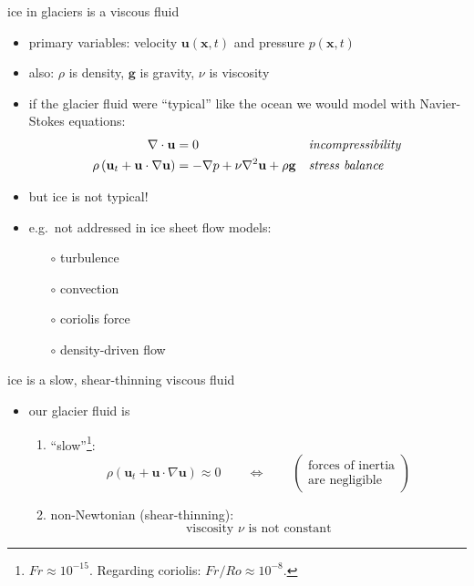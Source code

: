 \documentclass{beamer}
\newcommand{\bx}{\mathbf{x}}
\begin{document}
\begin{frame}{ice in glaciers is a viscous fluid}

\begin{itemize}
\item primary variables: velocity $\mathbf{u}(\bx,t)$ and pressure $p(\bx,t)$
\item also: $\rho$ is density, $\mathbf{g}$ is gravity, $\nu$ is viscosity
\item if the glacier fluid were ``typical'' like the ocean we would model with Navier-Stokes equations:
\begin{align*}
\nabla \cdot \mathbf{u} &= 0 &&\text{\emph{incompressibility}} \\
\rho \left(\mathbf{u}_t + \mathbf{u}\cdot\nabla \mathbf{u}\right) &= -\nabla p + \nu \nabla^2 \mathbf{u} + \rho \mathbf{g} &&\text{\emph{stress balance}}
\end{align*}
\item but ice is not typical!
\item e.g.~not addressed in ice sheet flow models:
  \begin{itemize}
  \item[$\circ$] turbulence
  \item[$\circ$] convection
  \item[$\circ$] coriolis force
  \item[$\circ$] density-driven flow
  \end{itemize}
\end{itemize}
\end{frame}


\begin{frame}{ice is a slow, shear-thinning viscous fluid}

\begin{itemize}
\item our glacier fluid is
  \begin{enumerate}
  \item ``slow''\footnote{$Fr\approx 10^{-15}$.  Regarding coriolis: $Fr/Ro \approx 10^{-8}$.}:
    $$\rho \left(\mathbf{u}_t + \mathbf{u}\cdot\nabla \mathbf{u}\right) \approx 0 \qquad \iff \qquad \begin{pmatrix} \text{forces of inertia} \\ \text{are negligible} \end{pmatrix}$$
  \item non-Newtonian (shear-thinning):
    $$\text{viscosity $\nu$ is not constant}$$
  \end{enumerate}
\end{itemize}
\end{frame}
\end{document}
